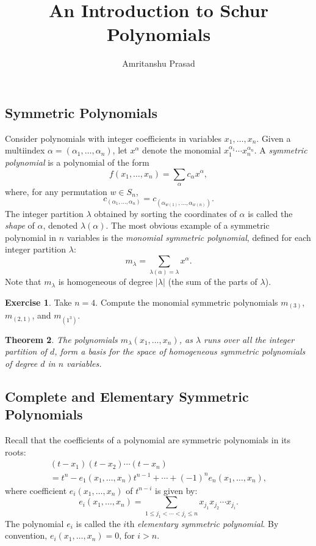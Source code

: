 \documentclass[11pt]{amsproc}
\title{An Introduction to Schur Polynomials}
\author{Amritanshu Prasad}
\newtheorem{theorem}{Theorem}[subsection]
\theoremstyle{definition}
\theoremstyle{example}
\newtheorem{exercise}[theorem]{Exercise}
\begin{document}
\maketitle
\subsection{Symmetric Polynomials}
\label{sec:symmetric-functions}
Consider polynomials with integer coefficients in variables $x_1,\dotsc,x_n$.
Given a multiindex $\alpha=(\alpha_1,\dotsc, \alpha_n)$, let $x^\alpha$ denote the monomial $x_1^{\alpha_1}\dotsb x_n^{\alpha_n}$.
A \emph{symmetric polynomial} is a polynomial of the form
\begin{displaymath}
  f(x_1,\dotsc, x_n) = \sum_{\alpha} c_\alpha x^\alpha,
\end{displaymath}
where, for any permutation $w\in S_n$,
\begin{displaymath}
  c_{(\alpha_1,\dotsc,\alpha_n)} = c_{(\alpha_{w(1)},\dotsc,\alpha_{w(n)})}.
\end{displaymath}
The integer partition $\lambda$ obtained by sorting the coordinates of $\alpha$  is called the \emph{shape} of $\alpha$, denoted $\lambda(\alpha)$.
The most obvious example of a symmetric polynomial in $n$ variables is the \emph{monomial symmetric polynomial}, defined for each integer partition $\lambda$:
\begin{displaymath}
  m_\lambda = \sum_{\lambda(\alpha) = \lambda} x^\alpha.
\end{displaymath}
Note that $m_\lambda$ is homogeneous of degree $|\lambda|$ (the sum of the parts of $\lambda$).
\begin{exercise}
  Take $n=4$. Compute the monomial symmetric polynomials $m_{(3)}$, $m_{(2,1)}$, and $m_{(1^3)}$.
\end{exercise}
\begin{theorem}
The polynomials $m_\lambda(x_1,\dotsc,x_n)$, as $\lambda$ runs over all the integer partition of $d$, form a basis for the space of homogeneous symmetric polynomials of degree $d$ in $n$ variables.
\end{theorem}
\subsection{Complete and Elementary Symmetric Polynomials}
\label{sec:compl-elem-symm}
Recall that the coefficients of a polynomial are symmetric polynomials in its roots:
\begin{multline}
  \label{eq:elem-id}
  (t-x_1)(t-x_2)\dotsb (t-x_n) \\= t^n - e_1(x_1,\dotsc, x_n)t^{n-1} + \dotsb + (-1)^n e_n(x_1,\dotsc, x_n),
\end{multline}
where coefficient $e_i(x_1,\dotsc, x_n)$ of $t^{n-i}$ is given by:
\begin{equation}
  \label{eq:elem}
  e_i(x_1,\dotsc, x_n) = \sum_{1\leq j_1<\dotsb<j_i\leq n} x_{j_1}x_{j_2}\dotsb x_{j_i}.
\end{equation}
The polynomial $e_i$ is called the $i$th \emph{elementary symmetric polynomial}.
By convention, $e_i(x_1,\dotsc,x_n)=0$, for $i>n$.
\end{document}
